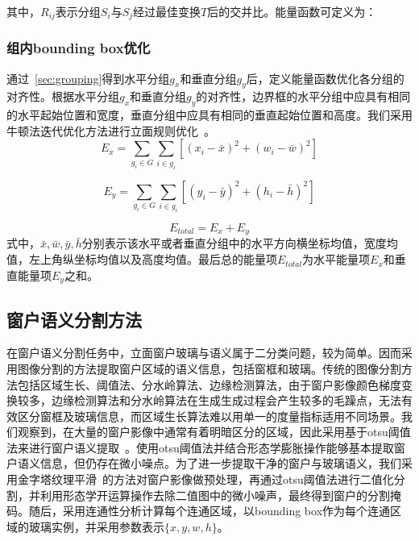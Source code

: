 \documentclass[10pt,twocolumn,letterpaper]{article}
\begin{document}
其中，${R}_{ij}$表示分组${S}_i$与${S}_j$经过最佳变换${T}$后的交并比。能量函数可定义为：


\subsubsection{组内bounding box优化}
通过~\ref{sec:grouping}得到水平分组${g}_x$和垂直分组${g}_y$后，定义能量函数优化各分组的对齐性。根据水平分组${g}_x$和垂直分组${g}_y$的对齐性，边界框的水平分组中应具有相同的水平起始位置和宽度，垂直分组中应具有相同的垂直起始位置和高度。我们采用牛顿法迭代优化方法进行立面规则优化~\cite{fletcher2000practical}。
\begin{equation}
E_{x}= \sum_{g_{i} \in G }\sum_{i \in g_{i}} \left [ \left (x_{i}-\bar{x}     \right )^2+\left (w_{i}-\bar{w}    \right )^2  \right ] 
\label{eq:Ex}
\end{equation}

\begin{equation}
E_{y}= \sum_{g_{i} \in G }\sum_{i \in g_{i}} \left [ \left (y_{i}-\bar{y}    \right )^2+\left (h_{i}-\bar{h}  \right )^2  \right ]  
\label{eq:Ey}
\end{equation}

\begin{equation}
E_{total}=E_{x}+E_{y}
\label{eq:Etotal}
\end{equation}
式中，$\bar{x},\bar{w},\bar{y},\bar{h}$分别表示该水平或者垂直分组中的水平方向横坐标均值，宽度均值，左上角纵坐标均值以及高度均值。最后总的能量项${E}_{total}$为水平能量项${E}_x$和垂直能量项${E}_y$之和。

\subsection{窗户语义分割方法}

在窗户语义分割任务中，立面窗户玻璃与语义属于二分类问题，较为简单。因而采用图像分割的方法提取窗户区域的语义信息，包括窗框和玻璃。传统的图像分割方法包括区域生长、阈值法、分水岭算法、边缘检测算法，由于窗户影像颜色梯度变换较多，边缘检测算法和分水岭算法在生成生成过程会产生较多的毛躁点，无法有效区分窗框及玻璃信息，而区域生长算法难以用单一的度量指标适用不同场景。我们观察到，在大量的窗户影像中通常有着明暗区分的区域，因此采用基于otsu阈值法来进行窗户语义提取~\cite{4310076}。使用otsu阈值法并结合形态学膨胀操作能够基本提取窗户语义信息，但仍存在微小噪点。为了进一步提取干净的窗户与玻璃语义，我们采用金字塔纹理平滑~\cite{10.1145/3592120}的方法对窗户影像做预处理，再通过otsu阈值法进行二值化分割，并利用形态学开运算操作去除二值图中的微小噪声，最终得到窗户的分割掩码。随后，采用连通性分析计算每个连通区域，以bounding box作为每个连通区域的玻璃实例，并采用参数表示${\{x,y,w,h\}}$。
\end{document}

